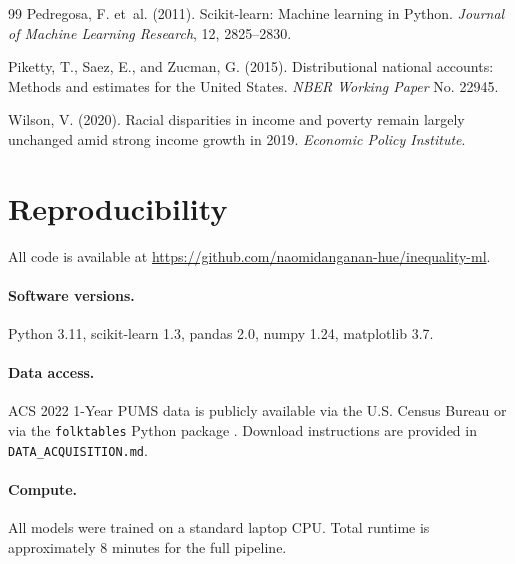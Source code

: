 \documentclass[11pt]{article}
\begin{document}
\begin{thebibliography}{99}
Pedregosa, F. et~al. (2011).
\newblock Scikit-learn: Machine learning in Python.
\newblock \textit{Journal of Machine Learning Research}, 12, 2825--2830.

Piketty, T., Saez, E., and Zucman, G. (2015).
\newblock Distributional national accounts: Methods and estimates for the
  United States.
\newblock \textit{NBER Working Paper} No. 22945.

Wilson, V. (2020).
\newblock Racial disparities in income and poverty remain largely unchanged
  amid strong income growth in 2019.
\newblock \textit{Economic Policy Institute}.

\end{thebibliography}

\appendix
\section{Reproducibility}

All code is available at \url{https://github.com/naomidanganan-hue/inequality-ml}.

\paragraph{Software versions.}
Python 3.11, scikit-learn 1.3, pandas 2.0, numpy 1.24, matplotlib 3.7.

\paragraph{Data access.}
ACS 2022 1-Year PUMS data is publicly available via the U.S. Census Bureau
or via the \texttt{folktables} Python package \citep{ding2021retiring}.
Download instructions are provided in \texttt{DATA\_ACQUISITION.md}.

\paragraph{Compute.}
All models were trained on a standard laptop CPU. Total runtime is
approximately 8 minutes for the full pipeline.
\end{document}
